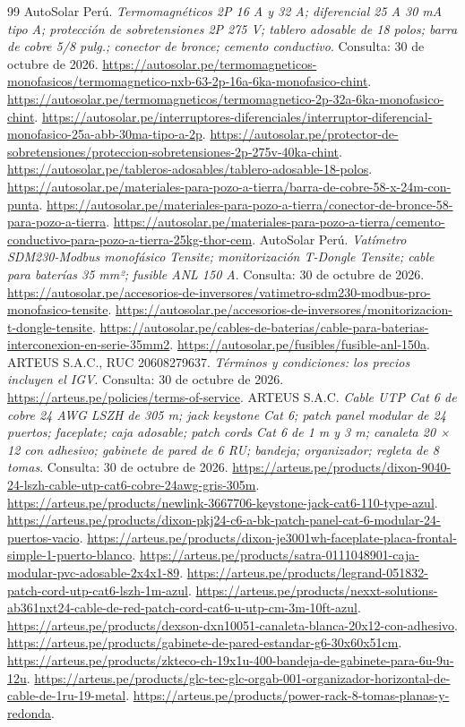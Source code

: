 \begin{thebibliography}{99}
 AutoSolar Perú. \emph{Termomagnéticos 2P 16 A y 32 A; diferencial 25 A 30 mA tipo A; protección de sobretensiones 2P 275 V; tablero adosable de 18 polos; barra de cobre 5/8 pulg.; conector de bronce; cemento conductivo}. Consulta: 30 de octubre de 2026. \url{https://autosolar.pe/termomagneticos-monofasicos/termomagnetico-nxb-63-2p-16a-6ka-monofasico-chint}. \url{https://autosolar.pe/termomagneticos/termomagnetico-2p-32a-6ka-monofasico-chint}. \url{https://autosolar.pe/interruptores-diferenciales/interruptor-diferencial-monofasico-25a-abb-30ma-tipo-a-2p}. \url{https://autosolar.pe/protector-de-sobretensiones/proteccion-sobretensiones-2p-275v-40ka-chint}. \url{https://autosolar.pe/tableros-adosables/tablero-adosable-18-polos}. \url{https://autosolar.pe/materiales-para-pozo-a-tierra/barra-de-cobre-58-x-24m-con-punta}. \url{https://autosolar.pe/materiales-para-pozo-a-tierra/conector-de-bronce-58-para-pozo-a-tierra}. \url{https://autosolar.pe/materiales-para-pozo-a-tierra/cemento-conductivo-para-pozo-a-tierra-25kg-thor-cem}.
 AutoSolar Perú. \emph{Vatímetro SDM230-Modbus monofásico Tensite; monitorización T-Dongle Tensite; cable para baterías 35 mm²; fusible ANL 150 A}. Consulta: 30 de octubre de 2026. \url{https://autosolar.pe/accesorios-de-inversores/vatimetro-sdm230-modbus-pro-monofasico-tensite}. \url{https://autosolar.pe/accesorios-de-inversores/monitorizacion-t-dongle-tensite}. \url{https://autosolar.pe/cables-de-baterias/cable-para-baterias-interconexion-en-serie-35mm2}. \url{https://autosolar.pe/fusibles/fusible-anl-150a}.
 ARTEUS S.A.C., RUC 20608279637. \emph{Términos y condiciones: los precios incluyen el IGV}. Consulta: 30 de octubre de 2026. \url{https://arteus.pe/policies/terms-of-service}.
 ARTEUS S.A.C. \emph{Cable UTP Cat 6 de cobre 24 AWG LSZH de 305 m; jack keystone Cat 6; patch panel modular de 24 puertos; faceplate; caja adosable; patch cords Cat 6 de 1 m y 3 m; canaleta 20 × 12 con adhesivo; gabinete de pared de 6 RU; bandeja; organizador; regleta de 8 tomas}. Consulta: 30 de octubre de 2026. \url{https://arteus.pe/products/dixon-9040-24-lszh-cable-utp-cat6-cobre-24awg-gris-305m}. \url{https://arteus.pe/products/newlink-3667706-keystone-jack-cat6-110-type-azul}. \url{https://arteus.pe/products/dixon-pkj24-c6-a-bk-patch-panel-cat-6-modular-24-puertos-vacio}. \url{https://arteus.pe/products/dixon-je3001wh-faceplate-placa-frontal-simple-1-puerto-blanco}. \url{https://arteus.pe/products/satra-0111048901-caja-modular-pvc-adosable-2x4x1-89}. \url{https://arteus.pe/products/legrand-051832-patch-cord-utp-cat6-lszh-1m-azul}. \url{https://arteus.pe/products/nexxt-solutions-ab361nxt24-cable-de-red-patch-cord-cat6-u-utp-cm-3m-10ft-azul}. \url{https://arteus.pe/products/dexson-dxn10051-canaleta-blanca-20x12-con-adhesivo}. \url{https://arteus.pe/products/gabinete-de-pared-estandar-g6-30x60x51cm}. \url{https://arteus.pe/products/zkteco-ch-19x1u-400-bandeja-de-gabinete-para-6u-9u-12u}. \url{https://arteus.pe/products/glc-tec-glc-orgab-001-organizador-horizontal-de-cable-de-1ru-19-metal}. \url{https://arteus.pe/products/power-rack-8-tomas-planas-y-redonda}.

\end{thebibliography}
